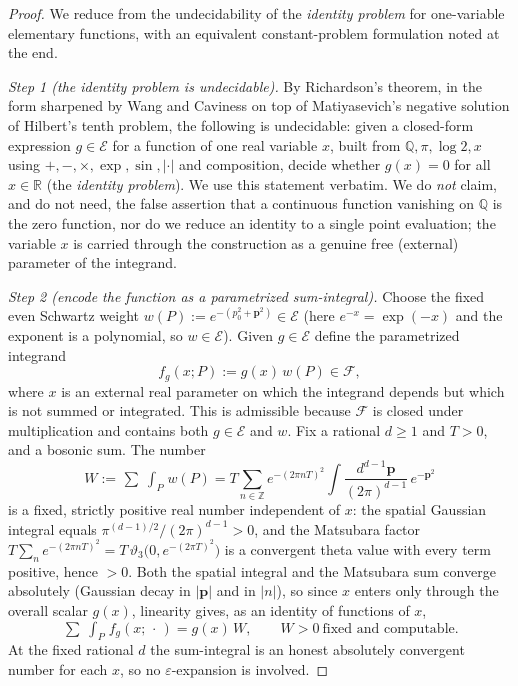 \documentclass{amsart}
\theoremstyle{definition}
\begin{document}
\begin{proof}
We reduce from the undecidability of the \emph{identity problem} for
one-variable elementary functions, with an equivalent constant-problem
formulation noted at the end.

\emph{Step 1 (the identity problem is undecidable).}
By Richardson's theorem, in the form sharpened by Wang and Caviness on top of
Matiyasevich's negative solution of Hilbert's tenth problem, the following is
undecidable: given a closed-form expression $g\in\mathcal E$ for a function of
one real variable $x$, built from $\mathbb Q,\pi,\log 2,x$ using
$+,-,\times,\exp,\sin,|\cdot|$ and composition, decide whether $g(x)=0$ for all
$x\in\mathbb R$ (the \emph{identity problem}). We use this statement verbatim.
We do \emph{not} claim, and do not need, the false assertion that a continuous
function vanishing on $\mathbb Q$ is the zero function, nor do we reduce an
identity to a single point evaluation; the variable $x$ is carried through the
construction as a genuine free (external) parameter of the integrand.

\emph{Step 2 (encode the function as a parametrized sum-integral).}
Choose the fixed even Schwartz weight
$w(P):=e^{-(p_0^2+\mathbf p^2)}\in\mathcal E$ (here $e^{-x}=\exp(-x)$ and the
exponent is a polynomial, so $w\in\mathcal E$). Given $g\in\mathcal E$ define
the parametrized integrand
\[
  f_g(x;P) := g(x)\,w(P)\in\mathcal F ,
\]
where $x$ is an external real parameter on which the integrand depends but which
is not summed or integrated. This is admissible because $\mathcal F$ is closed
under multiplication and contains both $g\in\mathcal E$ and $w$. Fix a rational
$d\ge 1$ and $T>0$, and a bosonic sum. The number
\[
  W:=\mathop{\textstyle\sum\!\!\!\!\!\!\int}_P w(P)
  =T\sum_{n\in\mathbb Z}e^{-(2\pi nT)^2}
   \int\!\frac{d^{d-1}\mathbf p}{(2\pi)^{d-1}}\,e^{-\mathbf p^2}
\]
is a fixed, strictly positive real number independent of $x$: the spatial
Gaussian integral equals $\pi^{(d-1)/2}/(2\pi)^{d-1}>0$, and the Matsubara
factor $T\sum_{n}e^{-(2\pi nT)^2}=T\,\vartheta_3\!\big(0,e^{-(2\pi T)^2}\big)$
is a convergent theta value with every term positive, hence $>0$. Both the
spatial integral and the Matsubara sum converge absolutely (Gaussian decay in
$|\mathbf p|$ and in $|n|$), so since $x$ enters only through the overall scalar
$g(x)$, linearity gives, as an identity of functions of $x$,
\begin{equation}\label{eq:encode}
  \mathop{\textstyle\sum\!\!\!\!\!\!\int}_P f_g(x;\,\cdot\,)
  = g(x)\,W ,\qquad W>0\ \text{fixed and computable}.
\end{equation}
At the fixed rational $d$ the sum-integral is an honest absolutely convergent
number for each $x$, so no $\varepsilon$-expansion is involved.


\end{proof}
\end{document}
